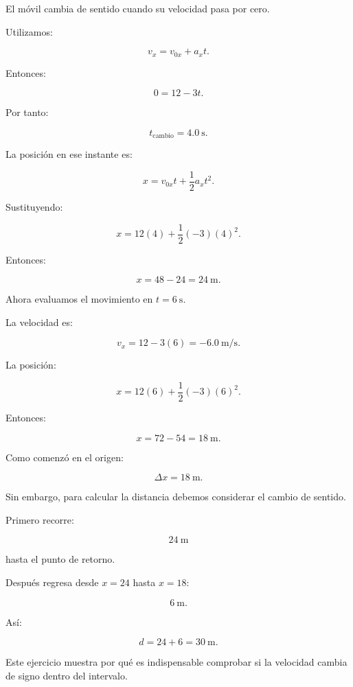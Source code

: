 \begin{explicacion}
El móvil cambia de sentido cuando su velocidad pasa por cero.

Utilizamos:

\[ v_x=v_{0x}+a_xt. \]

Entonces:

\[
0=12-3t.
\]

Por tanto:

\[ \boxed{t_{\mathrm{cambio}}=\SI{4.0}{\second}}. \]

La posición en ese instante es:

\[
x
=
v_{0x}t+\frac{1}{2}a_xt^2.
\]

Sustituyendo:

\[
x
=
12(4)
+
\frac{1}{2}(-3)(4)^2.
\]

Entonces:

\[
x
=
48-24
=
\boxed{\SI{24}{\meter}}.
\]

Ahora evaluamos el movimiento en \(t=\SI{6}{\second}\).

La velocidad es:

\[
v_x
=
12-3(6)
=
\boxed{-\SI{6.0}{\meter\per\second}}.
\]

La posición:

\[
x
=
12(6)
+
\frac{1}{2}(-3)(6)^2.
\]

Entonces:

\[
x
=
72-54
=
\boxed{\SI{18}{\meter}}.
\]

Como comenzó en el origen:

\[ \boxed{\Delta x=\SI{18}{\meter}}. \]

Sin embargo, para calcular la distancia debemos considerar el cambio de sentido.

Primero recorre:

\[ \SI{24}{\meter} \]

hasta el punto de retorno.

Después regresa desde \(x=24\) hasta \(x=18\):

\[ \SI{6}{\meter}. \]

Así:

\[
d
=
24+6
=
\boxed{\SI{30}{\meter}}.
\]

Este ejercicio muestra por qué es indispensable comprobar si la velocidad cambia de signo dentro del intervalo.
\end{explicacion}


